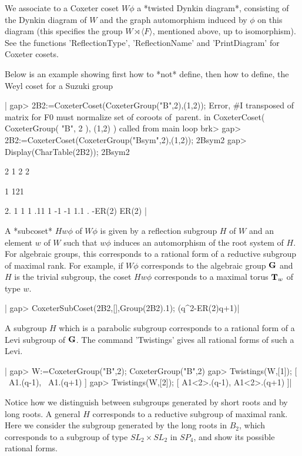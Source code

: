 We  associate  to  a  Coxeter  coset  $W\phi$  a  *twisted Dynkin diagram*,
consisting  of the Dynkin diagram of $W$ and the graph automorphism induced
by  $\phi$  on  this  diagram  (this  specifies  the group $W\rtimes\langle
F\rangle$,   mentioned  above,  up  to   isomorphism).  See  the  functions
'ReflectionType', 'ReflectionName' and 'PrintDiagram' for Coxeter cosets.

Below  is an example showing first how to *not* define, then how to define,
the Weyl coset for a Suzuki group\:

|    gap> 2B2:=CoxeterCoset(CoxeterGroup("B",2),(1,2));
    Error, #I transposed of matrix for F0 must normalize set of coroots of\
     parent.
     in
    CoxeterCoset( CoxeterGroup( "B", 2 ), (1,2) ) called from
    main loop
    brk>
    gap> 2B2:=CoxeterCoset(CoxeterGroup("Bsym",2),(1,2));
    2Bsym2
    gap> Display(CharTable(2B2));
    2Bsym2

         2 1      2     2

                  1   121

    2.     1      1     1
    .11    1     -1    -1
    1.1    . -ER(2) ER(2)
    |

A  *subcoset* $Hw\phi$ of $W\phi$ is given  by a reflection subgroup $H$ of
$W$  and an element $w$ of $W$ such that $w\phi$ induces an automorphism of
the  root  system  of  $H$.  For  algebraic  groups,  this corresponds to a
rational  form of  a reductive  subgroup of  maximal rank.  For example, if
$W\phi$  corresponds to  the algebraic  group ${\bf G}$  and $H$ is the trivial
subgroup, the coset $Hw\phi$ corresponds to a maximal torus ${\bf T}_w$ of type
$w$.

|    gap> CoxeterSubCoset(2B2,[],Group(2B2).1);
    (q^2-ER(2)q+1)|

A subgroup $H$ which is a parabolic subgroup corresponds to a rational form
of  a Levi  subgroup of  ${\bf G}$. The  command 'Twistings'  gives all rational
forms of such a Levi.

|    gap> W:=CoxeterGroup("B",2);
    CoxeterGroup("B",2)
    gap> Twistings(W,[1]);
    [ ~A1.(q-1), ~A1.(q+1) ]
    gap> Twistings(W,[2]);
    [ A1<2>.(q-1), A1<2>.(q+1) ]|

Notice how we distinguish between subgroups generated by short roots and by
long  roots. A general  $H$ corresponds to  a reductive subgroup of maximal
rank.  Here we consider the subgroup generated  by the long roots in $B_2$,
which  corresponds to a  subgroup of type  $SL_2\times SL_2$ in $SP_4$, and
show its possible rational forms.

